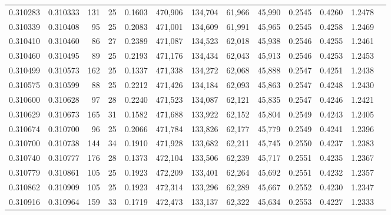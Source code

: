 \begin{tabular}{rrrrrrrrrrrrr}
0.310283 & 0.310333 &   131 &  25 &                                     0.1603 & 470,906 & 134,704 &  61,966 &  45,990 & 0.2545 & 0.4260 & 1.2478 \\
0.310339 & 0.310408 &    95 &  25 &                                     0.2083 & 471,001 & 134,609 &  61,991 &  45,965 & 0.2545 & 0.4258 & 1.2469 \\
0.310410 & 0.310460 &    86 &  27 &                                     0.2389 & 471,087 & 134,523 &  62,018 &  45,938 & 0.2546 & 0.4255 & 1.2461 \\
0.310460 & 0.310495 &    89 &  25 &                                     0.2193 & 471,176 & 134,434 &  62,043 &  45,913 & 0.2546 & 0.4253 & 1.2453 \\
0.310499 & 0.310573 &   162 &  25 &                                     0.1337 & 471,338 & 134,272 &  62,068 &  45,888 & 0.2547 & 0.4251 & 1.2438 \\
0.310575 & 0.310599 &    88 &  25 &                                     0.2212 & 471,426 & 134,184 &  62,093 &  45,863 & 0.2547 & 0.4248 & 1.2430 \\
0.310600 & 0.310628 &    97 &  28 &                                     0.2240 & 471,523 & 134,087 &  62,121 &  45,835 & 0.2547 & 0.4246 & 1.2421 \\
0.310629 & 0.310673 &   165 &  31 &                                     0.1582 & 471,688 & 133,922 &  62,152 &  45,804 & 0.2549 & 0.4243 & 1.2405 \\
0.310674 & 0.310700 &    96 &  25 &                                     0.2066 & 471,784 & 133,826 &  62,177 &  45,779 & 0.2549 & 0.4241 & 1.2396 \\
0.310700 & 0.310738 &   144 &  34 &                                     0.1910 & 471,928 & 133,682 &  62,211 &  45,745 & 0.2550 & 0.4237 & 1.2383 \\
0.310740 & 0.310777 &   176 &  28 &                                     0.1373 & 472,104 & 133,506 &  62,239 &  45,717 & 0.2551 & 0.4235 & 1.2367 \\
0.310779 & 0.310861 &   105 &  25 &                                     0.1923 & 472,209 & 133,401 &  62,264 &  45,692 & 0.2551 & 0.4232 & 1.2357 \\
0.310862 & 0.310909 &   105 &  25 &                                     0.1923 & 472,314 & 133,296 &  62,289 &  45,667 & 0.2552 & 0.4230 & 1.2347 \\
0.310916 & 0.310964 &   159 &  33 &                                     0.1719 & 472,473 & 133,137 &  62,322 &  45,634 & 0.2553 & 0.4227 & 1.2333 \\

\end{tabular}
